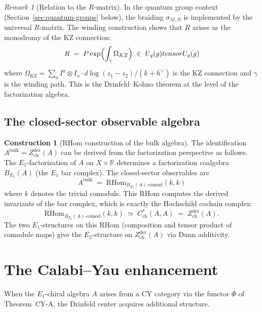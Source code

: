 \documentclass[11pt]{article}
\theoremstyle{definition}
\newtheorem{construction}[theorem]{Construction}
\theoremstyle{remark}
\newtheorem{remark}[theorem]{Remark}
\newcommand{\Uq}{U_q}
\newcommand{\RHom}{\mathrm{RHom}}
\newcommand{\frakg}{\mathfrak{g}}
\newcommand{\Zder}{Z^{\mathrm{der}}_{\mathrm{ch}}}
\begin{document}
\begin{remark}[Relation to the $R$-matrix]
\label{rem:r-matrix-winding}
In the quantum group context (Section~\ref{sec:quantum-groups} below), the braiding $\sigma_{M,N}$ is implemented by the universal $R$-matrix. The winding construction shows that $R$ arises as the monodromy of the KZ connection:
\[
 R \;=\; \mathcal{P}\exp\Bigl(\int_\gamma \Omega_{\mathrm{KZ}}\Bigr) \;\in\; \Uq(\frakg) \hat{\otimes} \Uq(\frakg)
\]
where $\Omega_{\mathrm{KZ}} = \sum_a I^a \otimes I_a \cdot d\log(z_1 - z_2)/(k + h^\vee)$ is the KZ connection and $\gamma$ is the winding path. This is the Drinfeld--Kohno theorem at the level of the factorization algebra.
\end{remark}


\subsection{The closed-sector observable algebra}

\begin{construction}[$\RHom$ construction of the bulk algebra]
\label{constr:rhom-bulk}
The identification $A^{\mathrm{bulk}} = \Zder(A)$ can be derived from the factorization perspective as follows. The $E_1$-factorization of $A$ on $X \times \mathbb{R}$ determines a factorization coalgebra $B_{E_1}(A)$ (the $E_1$ bar complex). The closed-sector observables are
\[
 A^{\mathrm{bulk}} \;=\; \RHom_{B_{E_1}(A)\text{-}\mathrm{comod}}(k, k)
\]
where $k$ denotes the trivial comodule. This $\RHom$ computes the derived invariants of the bar complex, which is exactly the Hochschild cochain complex:
\[
 \RHom_{B_{E_1}(A)\text{-}\mathrm{comod}}(k, k) \;\simeq\; C^*_{\mathrm{ch}}(A, A) \;=\; \Zder(A).
\]
The two $E_1$-structures on this $\RHom$ (composition and tensor product of comodule maps) give the $E_2$-structure on $\Zder(A)$ via Dunn additivity.
\end{construction}


\section{The Calabi--Yau enhancement}
\label{sec:cy-enhancement}

When the $E_1$-chiral algebra $A$ arises from a CY category via the functor $\Phi$ of Theorem~CY-A, the Drinfeld center acquires additional structure.
\end{document}
